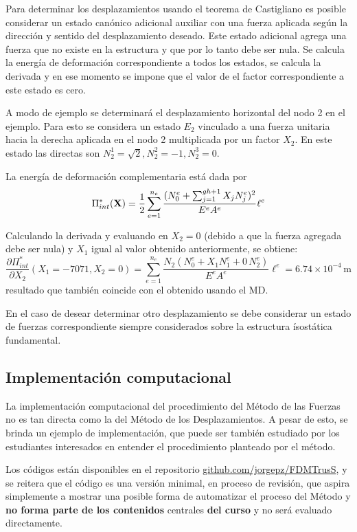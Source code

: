Para determinar los desplazamientos usando el teorema de Castigliano es posible considerar un estado canónico adicional auxiliar con una fuerza aplicada según la dirección y sentido del desplazamiento deseado. %
%
Este estado adicional agrega una fuerza que no existe en la estructura y que por lo tanto debe ser nula. Se calcula la energía de deformación correspondiente a todos los estados, se calcula la derivada y en ese momento se impone que el valor de el factor correspondiente a este estado es cero.

A modo de ejemplo se determinará el desplazamiento horizontal del nodo 2 en el ejemplo. %
%
Para esto se considera un estado $E_2$ vinculado a una fuerza unitaria hacia la derecha aplicada en el nodo 2 multiplicada por un factor $X_2$. %
%
En este estado las directas son $N_2^1 = \sqrt{2}, N_2^2 = -1, N_2^3 = 0$.


La energía de deformación complementaria está dada por
%
\begin{equation}
\Pi_{int}^*({\bf X}) = \frac{1}{2}  \sum_{e=1}^{n_e} \frac{(N_0^e +   \sum_{j=1}^{gh+1}  X_j N_j^e)^2}{E^e A^e} \ell^e 
\end{equation}

Calculando la derivada y evaluando en $X_2=0$ (debido a que la fuerza agregada debe ser nula) y $X_1$ igual al valor obtenido anteriormente, se obtiene:
\begin{equation}
\frac{\partial \Pi_{int}^*}{\partial X_2} (X_1=-7071,X_2=0) =  \sum_{e=1}^{n_e} \frac{N_2 (N_0^e +  X_1 N_1^e + 0 \, N_2^e  )}{E^e A^e} \ell^e  = 6.74 \times 10^{-4} \, \text{m}
\end{equation}
resultado que también coincide con el obtenido usando el MD.


En el caso de desear determinar otro desplazamiento se debe considerar un estado de fuerzas correspondiente siempre considerados sobre la estructura ísostática fundamental.

\subsection{Implementación computacional}

La implementación computacional del procedimiento del Método de las Fuerzas no es tan directa como la del Método de los Desplazamientos. %
%
A pesar de esto, se brinda un ejemplo de implementación, que puede ser también estudiado por los estudiantes interesados en entender el procedimiento planteado por el método. %

Los códigos están disponibles en el repositorio \href{https://github.com/jorgepz/FDMTrusS}{github.com/jorgepz/FDMTrusS}, y se reitera que el código es una versión minimal, en proceso de revisión, que aspira simplemente a mostrar una posible forma de automatizar el proceso del Método y  \textbf{no forma parte de los contenidos} centrales \textbf{del curso} y no será evaluado directamente. %
%


